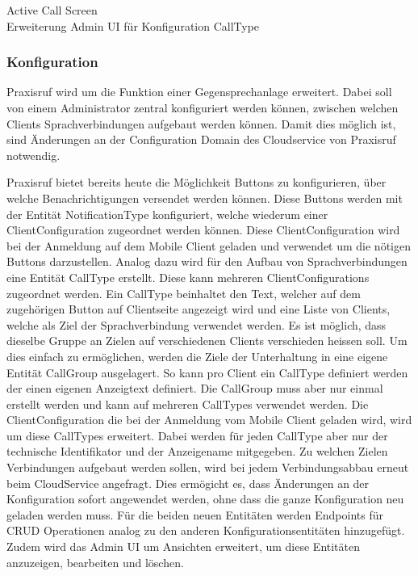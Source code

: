 Active Call Screen \\
Erweiterung Admin UI für Konfiguration CallType \\

\clearpage
\subsubsection*{Konfiguration}

Praxisruf wird um die Funktion einer Gegensprechanlage erweitert.
Dabei soll von einem Administrator zentral konfiguriert werden können, zwischen welchen Clients Sprachverbindungen
aufgebaut werden können.
Damit dies möglich ist, sind Änderungen an der Configuration Domain des Cloudservice von Praxisruf notwendig.

Praxisruf bietet bereits heute die Möglichkeit Buttons zu konfigurieren, über welche Benachrichtigungen versendet werden können.
Diese Buttons werden mit der Entität NotificationType konfiguriert, welche wiederum einer ClientConfiguration zugeordnet werden können.
Diese ClientConfiguration wird bei der Anmeldung auf dem Mobile Client geladen und verwendet um die nötigen Buttons darzustellen.
Analog dazu wird für den Aufbau von Sprachverbindungen eine Entität CallType erstellt.
Diese kann mehreren ClientConfigurations zugeordnet werden.
Ein CallType beinhaltet den Text, welcher auf dem zugehörigen Button auf Clientseite angezeigt wird und eine Liste von
Clients, welche als Ziel der Sprachverbindung verwendet werden.
Es ist möglich, dass dieselbe Gruppe an Zielen auf verschiedenen Clients verschieden heissen soll.
Um dies einfach zu ermöglichen, werden die Ziele der Unterhaltung in eine eigene Entität CallGroup ausgelagert.
So kann pro Client ein CallType definiert werden der einen eigenen Anzeigtext definiert.
Die CallGroup muss aber nur einmal erstellt werden und kann auf mehreren CallTypes verwendet werden.
Die ClientConfiguration die bei der Anmeldung vom Mobile Client geladen wird, wird um diese CallTypes erweitert.
Dabei werden für jeden CallType aber nur der technische Identifikator und der Anzeigename mitgegeben.
Zu welchen Zielen Verbindungen aufgebaut werden sollen, wird bei jedem Verbindungsabbau erneut beim CloudService angefragt.
Dies ermögicht es, dass Änderungen an der Konfiguration sofort angewendet werden, ohne dass die ganze Konfiguration neu geladen werden muss.
Für die beiden neuen Entitäten werden Endpoints für CRUD Operationen analog zu den anderen Konfigurationsentitäten hinzugefügt.
Zudem wird das Admin UI um Ansichten erweitert, um diese Entitäten anzuzeigen, bearbeiten und löschen.

